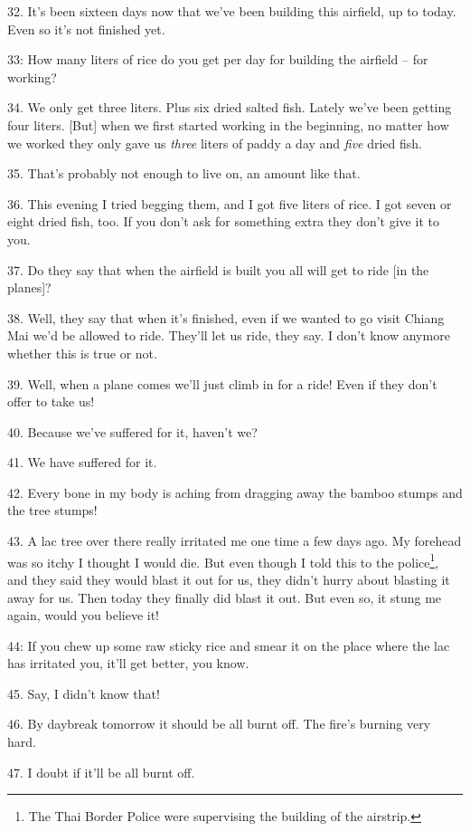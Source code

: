32. It's been sixteen days now that we've been building this airfield, up to today.
Even so it's not finished yet.

 33: How many liters of rice do you get per day for building
the airfield -- for working?

34. We only get three liters. Plus six dried salted fish. Lately we've been getting
four liters. [But] when we first started working in the beginning, no matter how
we worked they only gave us \textit{three} liters of paddy a day and \textit{five}
dried fish.

35. That's probably not enough to live on, an amount like that.

36. This evening I tried begging them, and I got five liters of rice. I got seven
or eight dried fish, too. If you don't ask for something extra they don't give
it to you.

37. Do they say that when the airfield is built you all will get to ride [in the
planes]?

38. Well, they say that when it's finished, even if we wanted to go visit Chiang
Mai we'd be allowed to ride. They'll let us ride, they say. I don't know anymore
whether this is true or not.

39. Well, when a plane comes we'll just climb in for a ride! Even if they don't
offer to take us!

40. Because we've suffered for it, haven't we?

41. We have suffered for it.

42. Every bone in my body is aching from dragging away the bamboo stumps and the
tree stumps!

43. A lac tree over there really irritated me one time a few days ago. My forehead
was so itchy I thought I would die. But even though I told this to the police\footnote{The Thai Border Police were supervising the building of the airstrip.},
and they said they would blast it out for us, they didn't hurry about blasting
it away for us. Then today they finally did blast it out. But even so, it stung
me again, would you believe it!

 44: If you chew up some raw sticky rice and smear it
on the place where the lac has irritated you, it'll get better, you know.

45. Say, I didn't know that!

46. By daybreak tomorrow it should be all burnt off. The fire's burning very hard.

47. I doubt if it'll be all burnt off.

